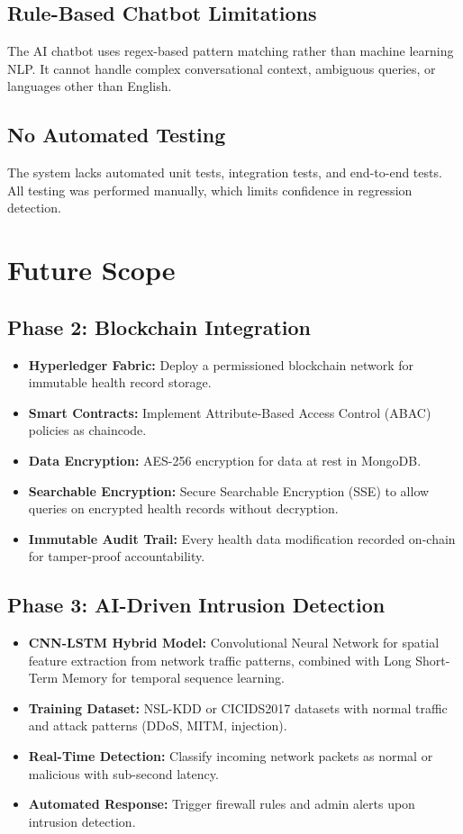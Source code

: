 \subsection{Rule-Based Chatbot Limitations}
The AI chatbot uses regex-based pattern matching rather than machine learning NLP. It cannot handle complex conversational context, ambiguous queries, or languages other than English.

\subsection{No Automated Testing}
The system lacks automated unit tests, integration tests, and end-to-end tests. All testing was performed manually, which limits confidence in regression detection.

\section{Future Scope}

\subsection{Phase 2: Blockchain Integration}
\begin{itemize}[leftmargin=*]
    \item \textbf{Hyperledger Fabric:} Deploy a permissioned blockchain network for immutable health record storage.
    \item \textbf{Smart Contracts:} Implement Attribute-Based Access Control (ABAC) policies as chaincode.
    \item \textbf{Data Encryption:} AES-256 encryption for data at rest in MongoDB.
    \item \textbf{Searchable Encryption:} Secure Searchable Encryption (SSE) to allow queries on encrypted health records without decryption.
    \item \textbf{Immutable Audit Trail:} Every health data modification recorded on-chain for tamper-proof accountability.
\end{itemize}

\subsection{Phase 3: AI-Driven Intrusion Detection}
\begin{itemize}[leftmargin=*]
    \item \textbf{CNN-LSTM Hybrid Model:} Convolutional Neural Network for spatial feature extraction from network traffic patterns, combined with Long Short-Term Memory for temporal sequence learning.
    \item \textbf{Training Dataset:} NSL-KDD or CICIDS2017 datasets with normal traffic and attack patterns (DDoS, MITM, injection).
    \item \textbf{Real-Time Detection:} Classify incoming network packets as normal or malicious with sub-second latency.
    \item \textbf{Automated Response:} Trigger firewall rules and admin alerts upon intrusion detection.
\end{itemize}

